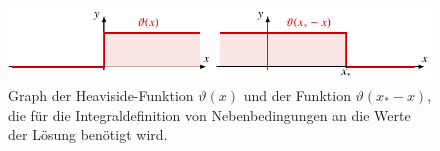 %
%
%
\begin{figure}
\centering
\includegraphics{chapters/050-nebenbedingungen/images/heaviside.pdf}
\caption{Graph der Heaviside-Funktion $\vartheta(x)$ und der Funktion
$\vartheta(x_* -x)$, die für die Integraldefinition von Nebenbedingungen
an die Werte der Lösung benötigt wird.
\label{buch:nebenbedingungen:lagrangemult:fig:heaviside}}
\end{figure}
